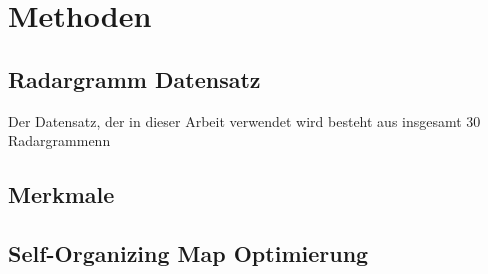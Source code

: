 \section{Methoden}

\subsection{Radargramm Datensatz}
Der Datensatz, der in dieser Arbeit verwendet wird besteht aus insgesamt 30 Radargrammenn

\subsection{Merkmale}
\lipsum[1-8]

\subsection{Self-Organizing Map Optimierung}
\lipsum[1-5]